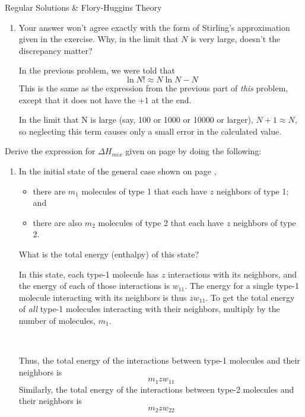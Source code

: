 \begin{activity}{Regular Solutions \& Flory-Huggins Theory}
\begin{exercises}
\begin{enumerate}
				\item Your answer won't agree exactly with the form of Stirling's approximation given in the exercise.  Why, in the limit that $N$ is very large, doesn't the discrepancy matter?
				
					\begin{solution}{}
						In the previous problem, we were told that
						\begin{equation*}
							\ln N! \approx N \ln N - N
						\end{equation*}
						This is the same as the expression from the previous part of \emph{this} problem, except that it does not have the $+1$ at the end.
						
						In the limit that N is large (say, 100 or 1000 or 10000 or larger), $N+1 \approx N$, so neglecting this term causes only a small error in the calculated value.
					\end{solution}
					
			\end{enumerate}
			
	\exercise Derive the expression for $\Delta H_{mix}$ given on page \pageref{\labelbase:eqn:Hmix} by doing the following: \label{\labelbase:exc:mixingenthalpy}
		
		\begin{enumerate}
		
		\item In the initial state of the general case shown on page \pageref{\labelbase:eqn:idealS}, 
		\begin{itemize}[itemsep=0pt,topsep=3pt]
			\item there are $m_1$ molecules of type 1 that each have $z$ neighbors of type 1; and
			\item there are also $m_2$ molecules of type 2 that each have $z$ neighbors of type 2.
		\end{itemize}
		What is the total energy (enthalpy) of this state?
		
		\begin{solution}{}
			In this state, each type-1 molecule has $z$ interactions with its neighbors, and the energy of each of those interactions is $w_{11}$.  The energy for a single type-1 molecule interacting with its neighbors is thus $zw_{11}$.
			To get the total energy of \emph{all} type-1 molecules interacting with their neighbors, multiply by the number of molecules, $m_1$.
			
~			
			
			Thus, the total energy of the interactions between type-1 molecules and their neighbors is
			\begin{equation*}
				m_1 z w_{11}
			\end{equation*}
			Similarly, the total energy of the interactions between type-2 molecules and their neighbors is 
			\begin{equation*}
				m_2 z w_{22}
			\end{equation*}
			

\end{solution}
\end{enumerate}
\end{exercises}
\end{activity}
